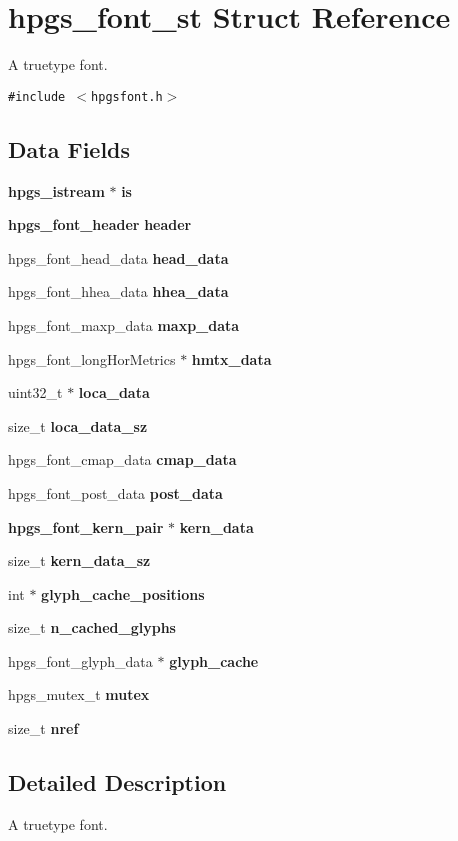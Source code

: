\section{hpgs\_\-font\_\-st Struct Reference}
\label{structhpgs__font__st}
A truetype font.  


{\tt \#include $<$hpgsfont.h$>$}

\subsection*{Data Fields}
\begin{CompactItemize}
\item 
{\bf hpgs\_\-istream} $\ast$ {\bf is}
\item 
{\bf hpgs\_\-font\_\-header} \textbf{header}\label{structhpgs__font__st_a73c2cf94596cd81d8eba9e8dcbf56db}

\item 
hpgs\_\-font\_\-head\_\-data {\bf head\_\-data}
\item 
hpgs\_\-font\_\-hhea\_\-data {\bf hhea\_\-data}
\item 
hpgs\_\-font\_\-maxp\_\-data {\bf maxp\_\-data}
\item 
hpgs\_\-font\_\-longHorMetrics $\ast$ {\bf hmtx\_\-data}
\item 
uint32\_\-t $\ast$ {\bf loca\_\-data}
\item 
size\_\-t {\bf loca\_\-data\_\-sz}
\item 
hpgs\_\-font\_\-cmap\_\-data {\bf cmap\_\-data}
\item 
hpgs\_\-font\_\-post\_\-data {\bf post\_\-data}
\item 
{\bf hpgs\_\-font\_\-kern\_\-pair} $\ast$ \textbf{kern\_\-data}\label{structhpgs__font__st_252e4f0f49ac6a3f9fabf36456c68c6f}

\item 
size\_\-t {\bf kern\_\-data\_\-sz}
\item 
int $\ast$ {\bf glyph\_\-cache\_\-positions}
\item 
size\_\-t {\bf n\_\-cached\_\-glyphs}
\item 
hpgs\_\-font\_\-glyph\_\-data $\ast$ {\bf glyph\_\-cache}
\item 
hpgs\_\-mutex\_\-t {\bf mutex}
\item 
size\_\-t {\bf nref}
\end{CompactItemize}


\subsection{Detailed Description}
A truetype font. 

